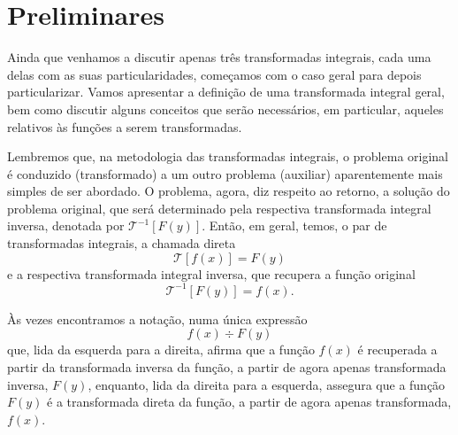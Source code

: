 \section{Preliminares}

Ainda que venhamos a discutir apenas três transformadas integrais, cada uma delas com as suas particularidades, começamos com o caso geral para depois particularizar. Vamos apresentar a definição de uma transformada integral geral, bem como discutir alguns conceitos que serão necessários, em particular, aqueles relativos às funções a serem transformadas.



Lembremos que, na metodologia das transformadas integrais, o problema original é conduzido (transformado) a um outro problema (auxiliar) aparentemente mais simples de ser abordado. O problema, agora, diz respeito ao retorno, a solução do problema original, que será determinado pela respectiva transformada integral inversa, denotada por $\mathscr{T}^{-1}[F(y)]$. Então, em geral, temos, o par de transformadas integrais, a chamada direta
$$\mathscr{T}[f(x)] = F(y)$$
e a respectiva transformada integral inversa, que recupera a função original
$$\mathscr{T}^{-1}[F(y)] = f(x).$$

Às vezes encontramos a notação, numa única expressão
$$f(x) \div F(y)$$
que, lida da esquerda para a direita, afirma que a função $f(x)$ é recuperada a partir da transformada inversa da função, a partir de agora apenas transformada inversa,
$F(y)$, enquanto, lida da direita para a esquerda, assegura que a função $F(y)$ é a transformada direta da função, a partir de agora apenas transformada, $f(x)$.


